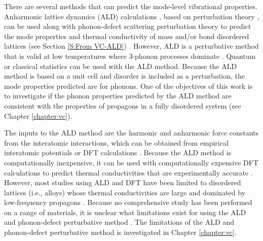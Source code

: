 There are several methods that can predict the mode-level vibrational 
properties. 
Anharmonic lattice dynamics (ALD) calculations 
\cite{turney_predicting_2009,esfarjani_heat_2011}, 
based on perturbation theory 
\cite{maradudin_dynamical_1974,srivastava_physics_1990},
can be used along with phonon-defect scattering perturbation 
theory to predict the mode properties and thermal conductivity 
of mass and/or bond disordered lattices (see Section \ref{S:From VC-ALD}) 
\cite{klemens_scattering_1955,klemens_thermal_1957,mattis_phonon_1957,
tamura_isotope_1983}.  
However, ALD is a perturbative method that is valid at low 
temperatures where 3-phonon processes dominate 
\cite{wallace_thermodynamics_1972,maradudin_dynamical_1974,
turney_predicting_2009}. 
Quantum or classical statistics can be used with the ALD method. 
Because the ALD method is based on a unit cell 
and disorder is included as a perturbation, the mode properties 
predicted are for phonons. One of the objectives of this work is 
to investigate if the phonon properties predicted by the ALD method 
are consistent with the properties of propagons in a fully 
disordered system (see Chapter \ref{chapter:vc}). 

The inputs to the ALD method are the harmonic and anharmonic 
force constants from the interatomic interactions, 
which can be obtained from empirical interatomic potentials or 
DFT calculations \cite{esfarjani_method_2008,turney_predicting_2009}. 
Because the ALD method is computationally inexpensive, it can be 
used with computationally expensive DFT calculations to predict 
thermal conductivities that are experimentally accurate 
\cite{broido_intrinsic_2007,ward_intrinsic_2010,ward_ab_2009,
garg_role_2011,lindsay_thermal_2012,li_thermal_2012,lindsay_thermal_2012,
lindsay_first-principles_2013,li_thermal_2012}. 
However, most studies using ALD and DFT have been limited to 
disordered lattices (i.e., alloys) whose thermal conductivities 
are large and dominated by low-frequency propagons 
\cite{broido_intrinsic_2007,ward_intrinsic_2010,ward_ab_2009,
garg_role_2011,lindsay_thermal_2012,lindsay_thermal_2012,
lindsay_first-principles_2013}. 
Because no comprehensive study has been performed on a range 
of materials, it is unclear what limitations exist for using the ALD and 
phonon-defect perturbative method 
\cite{luckyanova_coherent_2012,kundu_role_2011,shiomi_thermal_2011,
tian_phonon_2012,tian_enhancing_2012,luckyanova_coherent_2012}. 
The limitations of the ALD and phonon-defect perturbative 
method is investigated in Chapter \ref{chapter:vc}. 

